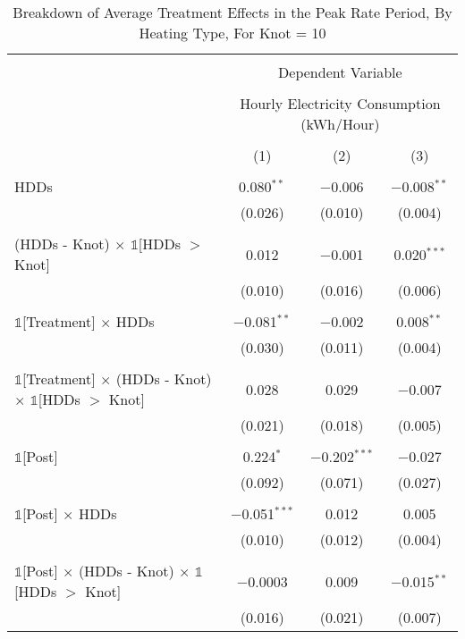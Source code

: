 
\begin{table}[!htbp] \centering 
  \caption{Breakdown of Average Treatment Effects in the Peak Rate Period, By Heating Type, For Knot = 10} 
  \label{Table:Breakdown-of-Average-Treatment-Effects-in-the-Peak-Rate-Period_By-Heating-Type_Knot-10} 
\small 
\begin{tabular}{@{\extracolsep{20pt}}lccc} 
\\[-1.8ex]\hline 
\hline \\[-1.8ex] 
 & \multicolumn{3}{c}{Dependent Variable} \\ 
\cline{2-4} 
\\[-1.8ex] & \multicolumn{3}{c}{Hourly Electricity Consumption  (kWh/Hour)} \\ 
\\[-1.8ex] & (1) & (2) & (3)\\ 
\hline \\[-1.8ex] 
 HDDs & 0.080$^{**}$ & $-$0.006 & $-$0.008$^{**}$ \\ 
  & (0.026) & (0.010) & (0.004) \\ 
  & & & \\ 
 (HDDs - Knot) $\times$ $\mathbb{1}$[HDDs $>$ Knot] & 0.012 & $-$0.001 & 0.020$^{***}$ \\ 
  & (0.010) & (0.016) & (0.006) \\ 
  & & & \\ 
 $\mathbb{1}$[Treatment] $\times$ HDDs & $-$0.081$^{**}$ & $-$0.002 & 0.008$^{**}$ \\ 
  & (0.030) & (0.011) & (0.004) \\ 
  & & & \\ 
 $\mathbb{1}$[Treatment] $\times$ (HDDs - Knot) $\times$ $\mathbb{1}$[HDDs $>$ Knot] & 0.028 & 0.029 & $-$0.007 \\ 
  & (0.021) & (0.018) & (0.005) \\ 
  & & & \\ 
 $\mathbb{1}$[Post] & 0.224$^{*}$ & $-$0.202$^{***}$ & $-$0.027 \\ 
  & (0.092) & (0.071) & (0.027) \\ 
  & & & \\ 
 $\mathbb{1}$[Post] $\times$ HDDs & $-$0.051$^{***}$ & 0.012 & 0.005 \\ 
  & (0.010) & (0.012) & (0.004) \\ 
  & & & \\ 
 $\mathbb{1}$[Post] $\times$ (HDDs - Knot) $\times$ $\mathbb{1}$[HDDs $>$ Knot] & $-$0.0003 & 0.009 & $-$0.015$^{**}$ \\ 
  & (0.016) & (0.021) & (0.007) \\ 

\end{tabular}
\end{table}
